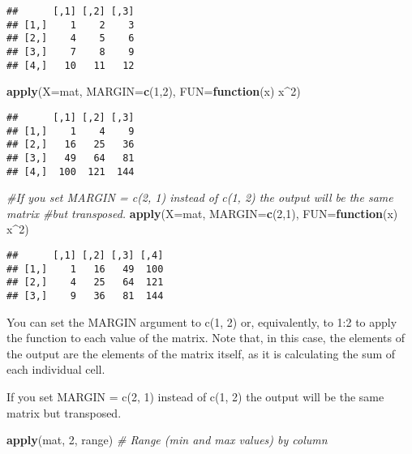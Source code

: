 \documentclass[
]{article}
\newenvironment{Shaded}{\begin{snugshade}}{\end{snugshade}}
\newcommand{\AttributeTok}[1]{\textcolor[rgb]{0.13,0.29,0.53}{#1}}
\newcommand{\CommentTok}[1]{\textcolor[rgb]{0.56,0.35,0.01}{\textit{#1}}}
\newcommand{\ControlFlowTok}[1]{\textcolor[rgb]{0.13,0.29,0.53}{\textbf{#1}}}
\newcommand{\DecValTok}[1]{\textcolor[rgb]{0.00,0.00,0.81}{#1}}
\newcommand{\FunctionTok}[1]{\textcolor[rgb]{0.13,0.29,0.53}{\textbf{#1}}}
\newcommand{\NormalTok}[1]{#1}
\newcommand{\SpecialCharTok}[1]{\textcolor[rgb]{0.81,0.36,0.00}{\textbf{#1}}}
\begin{document}
\begin{verbatim}
##      [,1] [,2] [,3]
## [1,]    1    2    3
## [2,]    4    5    6
## [3,]    7    8    9
## [4,]   10   11   12
\end{verbatim}

\begin{Shaded}
\begin{Highlighting}[]
\FunctionTok{apply}\NormalTok{(}\AttributeTok{X=}\NormalTok{mat, }\AttributeTok{MARGIN=}\FunctionTok{c}\NormalTok{(}\DecValTok{1}\NormalTok{,}\DecValTok{2}\NormalTok{), }\AttributeTok{FUN=}\ControlFlowTok{function}\NormalTok{(x) x}\SpecialCharTok{\^{}}\DecValTok{2}\NormalTok{)}
\end{Highlighting}
\end{Shaded}

\begin{verbatim}
##      [,1] [,2] [,3]
## [1,]    1    4    9
## [2,]   16   25   36
## [3,]   49   64   81
## [4,]  100  121  144
\end{verbatim}

\begin{Shaded}
\begin{Highlighting}[]
\CommentTok{\#If you set MARGIN = c(2, 1) instead of c(1, 2) the output will be the same matrix \#but transposed.}
\FunctionTok{apply}\NormalTok{(}\AttributeTok{X=}\NormalTok{mat, }\AttributeTok{MARGIN=}\FunctionTok{c}\NormalTok{(}\DecValTok{2}\NormalTok{,}\DecValTok{1}\NormalTok{), }\AttributeTok{FUN=}\ControlFlowTok{function}\NormalTok{(x) x}\SpecialCharTok{\^{}}\DecValTok{2}\NormalTok{)}
\end{Highlighting}
\end{Shaded}

\begin{verbatim}
##      [,1] [,2] [,3] [,4]
## [1,]    1   16   49  100
## [2,]    4   25   64  121
## [3,]    9   36   81  144
\end{verbatim}

You can set the MARGIN argument to c(1, 2) or, equivalently, to 1:2 to
apply the function to each value of the matrix. Note that, in this case,
the elements of the output are the elements of the matrix itself, as it
is calculating the sum of each individual cell.

If you set MARGIN = c(2, 1) instead of c(1, 2) the output will be the
same matrix but transposed.

\begin{Shaded}
\begin{Highlighting}[]
\FunctionTok{apply}\NormalTok{(mat, }\DecValTok{2}\NormalTok{, range)   }\CommentTok{\# Range (min and max values) by column}
\end{Highlighting}
\end{Shaded}
\end{document}
